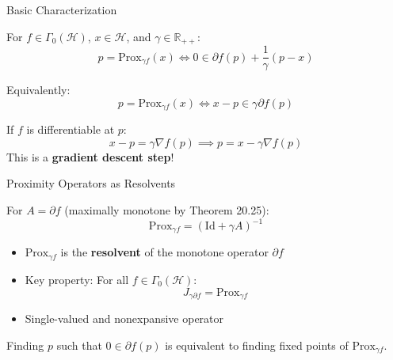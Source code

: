 \documentclass[aspectratio=169,10pt]{beamer}
\begin{document}
\begin{frame}{Basic Characterization}
\begin{theorem}
For $f \in \Gamma_0(\mathcal{H})$, $x \in \mathcal{H}$, and $\gamma \in \mathbb{R}_{++}$:
\[
p = \mathrm{Prox}_{\gamma f}(x) \iff 0 \in \partial f(p) + \frac{1}{\gamma}(p - x)
\]
\end{theorem}

\vspace{0.3cm}

\begin{corollary}
Equivalently:
\[
p = \mathrm{Prox}_{\gamma f}(x) \iff x - p \in \gamma \partial f(p)
\]
\end{corollary}

\vspace{0.3cm}

\begin{example}
If $f$ is differentiable at $p$:
\[
x - p = \gamma \nabla f(p) \implies p = x - \gamma \nabla f(p)
\]
This is a \textbf{gradient descent step}!
\end{example}
\end{frame}

\begin{frame}{Proximity Operators as Resolvents}
\begin{theorem}
For $A = \partial f$ (maximally monotone by Theorem 20.25):
\[
\mathrm{Prox}_{\gamma f} = (\mathrm{Id} + \gamma A)^{-1}
\]
\end{theorem}

\vspace{0.3cm}

\begin{itemize}
    \item $\mathrm{Prox}_{\gamma f}$ is the \textbf{resolvent} of the monotone operator $\partial f$
    \item Key property: For all $f \in \Gamma_0(\mathcal{H})$:
    \[
    J_{\gamma \partial f} = \mathrm{Prox}_{\gamma f}
    \]
    \item Single-valued and nonexpansive operator
\end{itemize}

\vspace{0.4cm}

\begin{corollary}
Finding $p$ such that $0 \in \partial f(p)$ is equivalent to finding fixed points of $\mathrm{Prox}_{\gamma f}$.
\end{corollary}
\end{frame}
\end{document}
